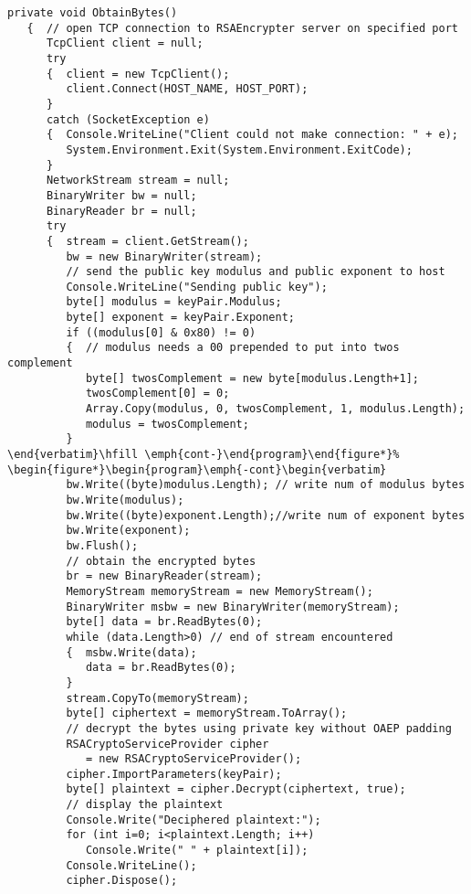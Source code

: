 \begin{lstlisting}[caption=RSA encryption in C\#]
   private void ObtainBytes()
   {  // open TCP connection to RSAEncrypter server on specified port
      TcpClient client = null;
      try
      {  client = new TcpClient();
         client.Connect(HOST_NAME, HOST_PORT);
      }
      catch (SocketException e)
      {  Console.WriteLine("Client could not make connection: " + e);
         System.Environment.Exit(System.Environment.ExitCode);
      }
      NetworkStream stream = null;
      BinaryWriter bw = null;
      BinaryReader br = null;
      try
      {  stream = client.GetStream();
         bw = new BinaryWriter(stream);
         // send the public key modulus and public exponent to host
         Console.WriteLine("Sending public key");
         byte[] modulus = keyPair.Modulus;
         byte[] exponent = keyPair.Exponent;
         if ((modulus[0] & 0x80) != 0)
         {  // modulus needs a 00 prepended to put into twos complement
            byte[] twosComplement = new byte[modulus.Length+1];
            twosComplement[0] = 0;
            Array.Copy(modulus, 0, twosComplement, 1, modulus.Length);
            modulus = twosComplement;
         }
\end{verbatim}\hfill \emph{cont-}\end{program}\end{figure*}%
\begin{figure*}\begin{program}\emph{-cont}\begin{verbatim}
         bw.Write((byte)modulus.Length); // write num of modulus bytes
         bw.Write(modulus);
         bw.Write((byte)exponent.Length);//write num of exponent bytes
         bw.Write(exponent);
         bw.Flush();
         // obtain the encrypted bytes
         br = new BinaryReader(stream);
         MemoryStream memoryStream = new MemoryStream();
         BinaryWriter msbw = new BinaryWriter(memoryStream);
         byte[] data = br.ReadBytes(0);
         while (data.Length>0) // end of stream encountered
         {  msbw.Write(data);
            data = br.ReadBytes(0);
         }
         stream.CopyTo(memoryStream);
         byte[] ciphertext = memoryStream.ToArray();
         // decrypt the bytes using private key without OAEP padding
         RSACryptoServiceProvider cipher
            = new RSACryptoServiceProvider();
         cipher.ImportParameters(keyPair);
         byte[] plaintext = cipher.Decrypt(ciphertext, true);
         // display the plaintext
         Console.Write("Deciphered plaintext:");
         for (int i=0; i<plaintext.Length; i++)
            Console.Write(" " + plaintext[i]);
         Console.WriteLine();
         cipher.Dispose();


\end{lstlisting}
